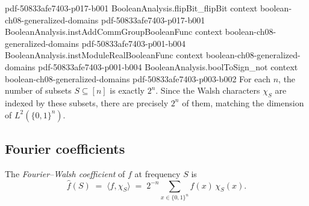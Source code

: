 \begin{lemma}
  {pdf-50833afe7403-p017-b001}
\proofstep
  {BooleanAnalysis.flipBit_flipBit}
  {context}
  {boolean-ch08-generalized-domains}
  {pdf-50833afe7403-p017-b001}
\proofstep
  {BooleanAnalysis.instAddCommGroupBooleanFunc}
  {context}
  {boolean-ch08-generalized-domains}
  {pdf-50833afe7403-p001-b004}
\proofstep
  {BooleanAnalysis.instModuleRealBooleanFunc}
  {context}
  {boolean-ch08-generalized-domains}
  {pdf-50833afe7403-p001-b004}
\proofstep
  {BooleanAnalysis.boolToSign_not}
  {context}
  {boolean-ch08-generalized-domains}
  {pdf-50833afe7403-p003-b002}
For each $n$, the number of subsets $S \subseteq [n]$ is exactly $2^n$. Since the Walsh
characters $\chi_S$ are indexed by these subsets, there are precisely $2^n$ of them,
matching the dimension of $L^2(\{0,1\}^n)$.
\end{lemma}

\subsection{Fourier coefficients}

\begin{definition}
\label{BooleanAnalysis.fourierCoeff}
\leanok
{}
The \emph{Fourier--Walsh coefficient} of $f$ at frequency $S$ is
\[
  \hat f(S) \;=\; \langle f, \chi_S\rangle
  \;=\; 2^{-n}\sum_{x\in\{0,1\}^n} f(x)\,\chi_S(x).
\]
\end{definition}

